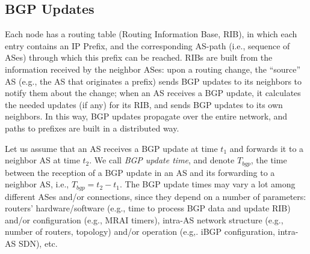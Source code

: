 \subsection{BGP Updates}
Each node has a routing table (Routing Information Base, RIB), in which each entry contains an IP Prefix, and the corresponding AS-path (i.e., sequence of ASes) through which this prefix can be reached. RIBs are built from the information received by the neighbor ASes: upon a routing change, the ``source'' AS (e.g., the AS that originates a prefix) sends BGP updates to its neighbors to notify them about the change; when an AS receives a BGP update, it calculates the needed updates (if any) for its RIB, and sends BGP updates to its own neighbors. In this way, BGP updates propagate over the entire network, and paths to prefixes are built in a distributed way.



Let us assume that an AS receives a BGP update at time $t_{1}$ and forwards it to a neighbor AS at time $t_{2}$. We call \textit{BGP update time}, and denote $T_{bgp}$, the time between the reception of a BGP update in an AS and its forwarding to a neighbor AS, i.e., $T_{bgp} = t_{2}-t_{1}$. The BGP update times may vary a lot among different ASes and/or connections, since they depend on a number of parameters: routers' hardware/software (e.g., time to process BGP data and update RIB) and/or configuration (e.g., MRAI timers), intra-AS network structure (e.g., number of routers, topology) and/or operation (e.g,. iBGP configuration, intra-AS SDN), etc. 


